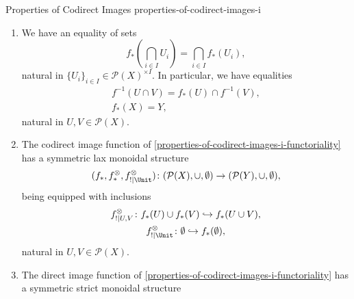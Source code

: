 \begin{proposition}{Properties of Codirect Images \rmI}{properties-of-codirect-images-i}
\begin{enumerate}
            \[
                \begin{gathered}
                    f_{*}(U)\cup f_{*}(V) \hookrightarrow f_{*}(U\cup V),\\
                    \emptyset             \hookrightarrow f_{*}(\emptyset),
                \end{gathered}
            \]%
            natural in $U,V\in\mathcal{P}(X)$.
        \item\label{properties-of-codirect-images-i-preservation-of-limits}We have an equality of sets
            \[
                f_{*}\left(\bigcap_{i\in I}U_{i}\right)%
                =%
                \bigcap_{i\in I}f_{*}(U_{i}),%
            \]%
            natural in $\{U_{i}\}_{i\in I}\in\mathcal{P}(X)^{\times I}$. In particular, we have equalities%
            \[
                \begin{gathered}
                    f^{-1}(U\cap V) = f_{*}(U)\cap f^{-1}(V),\\
                    f_{*}(X)        = Y,
                \end{gathered}
            \]%
            natural in $U,V\in\mathcal{P}(X)$.
        \item\label{properties-of-codirect-images-i-symmetric-lax-monoidality-with-respect-to-unions}The codirect image function of \cref{properties-of-codirect-images-i-functoriality} has a symmetric lax monoidal structure
            \[
                (f_{*},f^{\otimes}_{*},f^{\otimes}_{!|\Unit})
                \colon
                (\mathcal{P}(X),\cup,\emptyset)
                \to
                (\mathcal{P}(Y),\cup,\emptyset),
            \]%
            being equipped with inclusions%
            \[
                \begin{gathered}
                    f^{\otimes}_{!|U,V}   \colon f_{*}(U)\cup f_{*}(V) \hookrightarrow f_{*}(U\cup V),\\
                    f^{\otimes}_{!|\Unit} \colon \emptyset             \hookrightarrow f_{*}(\emptyset),
                \end{gathered}
            \]%
            natural in $U,V\in\mathcal{P}(X)$.
        \item\label{properties-of-codirect-images-i-symmetric-strict-monoidality-with-respect-to-intersections}The direct image function of \cref{properties-of-codirect-images-i-functoriality} has a symmetric strict monoidal structure

\end{enumerate}
\end{proposition}
